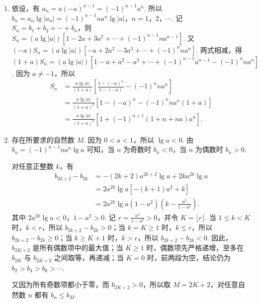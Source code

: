 \begin{solution}
\begin{enumerate}
\item 依设，有 \(a_{n}=a(-a)^{n-1}=(-1)^{n-1}a^{n}\). 所以 \(b_n = a_n \lg |a_n| = (-1)^{n-1}na^n \lg |a|\)，\(n=1\)，\(2\)，\(\cdots\). 记 \(S_n = b_1 + b_2 + \cdots + b_n\)，则
\(S_n = \left(a \lg |a| \right) \left[ 1 - 2a + 3a^2 + \cdots + (-1)^{n-1} na^{n-1} \right]\).
又
\((-a) S_n = \left(a \lg |a| \right) \left[ -a + 2a^2 - 3a^3 + \cdots + (-1)^n na^n \right]\).
两式相减，得
\((1 + a) S_n = \left(a \lg |a| \right) \left[ 1 - a + a^2 - a^3 + \cdots + (-1)^{n-1} a^{n-1} - (-1)^n na^n \right]\).
因为 \(a\neq-1\)，所以
\[
\begin{aligned}
S_{n}
&=\frac{a\lg\left|a\right|}{\left(1+a\right)}\left[\frac{1-\left(-a\right)^{n}}{1-\left(-a\right)}-\left(-1\right)^{n}na^{n}\right]\\
&=\frac{a\lg\left|a\right|}{\left(1+a\right)^{2}}\left[1-\left(-a\right)^{n}-\left(-1\right)^{n}na^{n}\left(1+a\right)\right]\\
&=\frac{a\lg\left|a\right|}{\left(1+a\right)^{2}}\left[1+\left(-1\right)^{n+1}\left(1+n+na\right)a^{n}\right].
\end{aligned}
\]

\item 存在所要求的自然数 \(M\). 因为 \(0<a<1\)，所以 \(\lg a<0\). 由 \(b_n=(-1)^{n-1}na^n\lg a\) 可知，当 \(n\) 为奇数时 \(b_n<0\)，当 \(n\) 为偶数时 \(b_n>0\).

对任意正整数 \(k\)，有
\[
\begin{aligned}
b_{2k+2} - b_{2k}
&=-(2k+2)a^{2k+2}\lg a+2ka^{2k}\lg a\\
&=2a^{2k}\lg a\left[-(k+1)a^{2}+k\right]\\
&=2a^{2k}\lg a\left(1-a^{2}\right)\left(k-\frac{a^{2}}{1-a^{2}}\right).
\end{aligned}
\]
其中 \(2a^{2k}\lg a<0\)，\(1-a^{2}>0\). 记 \(r=\frac{a^{2}}{1-a^{2}}>0\)，并令 \(K=\lfloor r\rfloor\). 当 \(1\leqslant k<K\) 时，\(k<r\)，所以 \(b_{2k+2}-b_{2k}>0\)；当 \(k=K\geqslant1\) 时，\(k\leqslant r\)，所以 \(b_{2k+2}-b_{2k}\geqslant0\)；当 \(k\geqslant K+1\) 时，\(k>r\)，所以 \(b_{2k+2}-b_{2k}<0\). 因此，\(b_{2K+2}\) 是所有偶数项中的最大值；当 \(K\geqslant1\) 时，偶数项先严格递增，至多在 \(b_{2K}\) 与 \(b_{2K+2}\) 之间取等，再递减；当 \(K=0\) 时，前两段为空，结论仍为 \(b_2>b_4>b_6>\cdots\).

又因为所有奇数项都小于零，而 \(b_{2K+2}>0\)，所以取 \(M=2K+2\)，对任意自然数 \(n\) 都有 \(b_n\leqslant b_M\).
\end{enumerate}
\end{solution}
